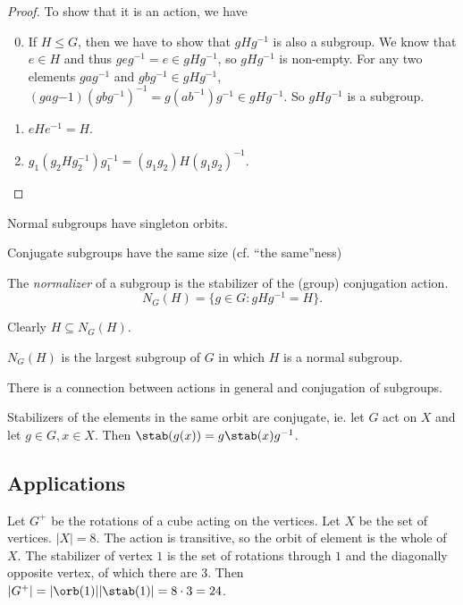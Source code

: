 \documentclass[a4paper]{article}
\begin{document}
\begin{proof}
  To show that it is an action, we have
  \begin{enumerate}[label=\arabic{*}.]
      \setcounter{enumi}{-1}
    \item If $H\leq G$, then we have to show that $gHg^{-1}$ is also a subgroup. We know that $e\in H$ and thus $geg^{-1} = e\in gHg^{-1}$, so $gHg^{-1}$ is non-empty. For any two elements $gag^{-1}$ and $gbg^{-1}\in gHg^{-1}$, $(gag{-1})(gbg^{-1})^{-1} = g(ab^{-1})g^{-1}\in gHg^{-1}$. So $gHg^{-1}$ is a subgroup.
    \item $eHe^{-1} = H$.
    \item $g_1(g_2Hg_2^{-1})g_1^{-1} = (g_1g_2)H(g_1g_2)^{-1}$.
  \end{enumerate}
\end{proof}
\note Normal subgroups have singleton orbits.

\note Conjugate subgroups have the same size (cf. ``the same''ness)

\begin{defi}
  The \emph{normalizer} of a subgroup is the stabilizer of the (group) conjugation action.
  \[
    N_G(H) = \{g\in G: gHg^{-1} = H\}.
  \]
\end{defi}
\note Clearly $H\subseteq N_G(H)$.

\begin{prop}
  $N_G(H)$ is the largest subgroup of $G$ in which $H$ is a normal subgroup.
\end{prop}

There is a connection between actions in general and conjugation of subgroups.

\begin{lemma}
  Stabilizers of the elements in the same orbit are conjugate, ie. let $G$ act on $X$ and let $g\in G, x\in X$. Then $\stab(g(x)) = g\stab(x)g^{-1}$.
\end{lemma}

\subsection{Applications}
\begin{eg}
  Let $G^{+}$ be the rotations of a cube acting on the vertices. Let $X$ be the set of vertices. $|X| = 8$. The action is transitive, so the orbit of element is the whole of $X$. The stabilizer of vertex $1$ is the set of rotations through $1$ and the diagonally opposite vertex, of which there are 3. Then $|G^{+}| = |\orb(1)||\stab(1)| = 8\cdot 3 = 24$.
\end{eg}
\end{document}
